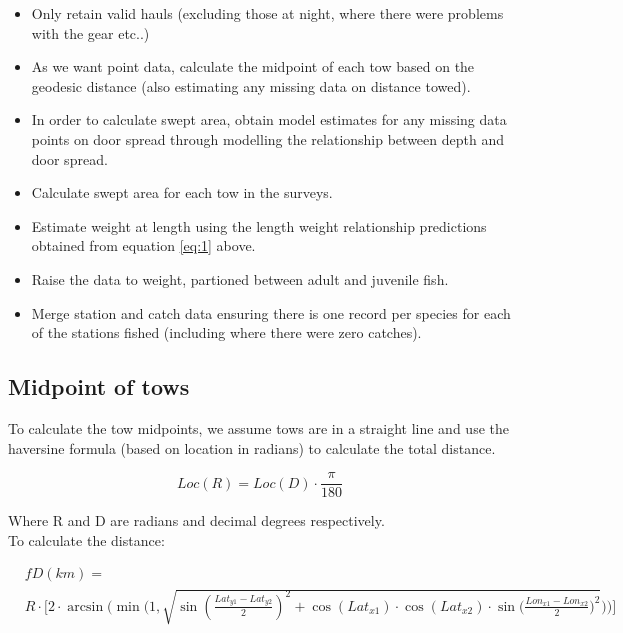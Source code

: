 \documentclass[12pt]{article}\usepackage[]{graphicx}\usepackage[]{color}
\begin{document}
\begin{itemize}
	\item Only retain valid hauls (excluding those at night, where there
		were problems with the gear etc..)
	\item As we want point data, calculate the midpoint of each tow based
		on the geodesic distance (also estimating any missing data on
		distance towed).
	\item In order to calculate swept area, obtain model estimates for any
		missing data points on door spread through modelling the
		relationship between depth and door spread.
	\item Calculate swept area for each tow in the surveys.
	\item Estimate weight at length using the length weight relationship
		predictions obtained from equation \ref{eq:1} above.
	\item Raise the data to weight, partioned between adult and juvenile fish.
	\item Merge station and catch data ensuring there is one record per
		species for each of the stations fished (including where there
		were zero catches).
\end{itemize}

\subsection{Midpoint of tows}

To calculate the tow midpoints, we assume tows are in a straight line and use
the haversine formula (based on location in radians) to calculate the total distance.

\begin{equation}
	Loc(R) = Loc(D) \cdot \frac{\pi}{180}
\end{equation}

Where R and D are radians and decimal degrees respectively. \\

To calculate the distance:

\begin{equation}
	\begin{split}
	& f D(km) = \\
	& R \cdot \Bigg[2 \cdot \arcsin \Bigg(\min\bigg(1,
	\sqrt{\sin({\frac{Lat_{y1} - Lat_{y2}}{2}})^2 + \cos(Lat_{x1}) \cdot
		\cos(Lat_{x2}) \cdot \sin({\frac{Lon_{x1} -
				Lon_{x2}}{2})^2}}\bigg)\Bigg)\Bigg]
\end{split}
\end{equation}
\end{document}
